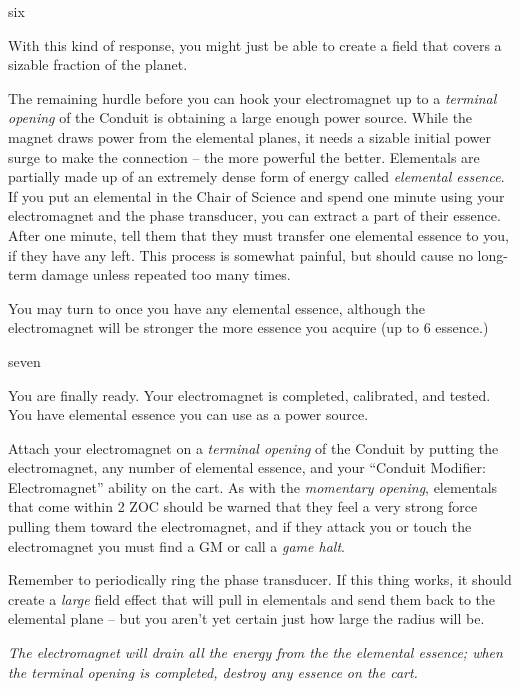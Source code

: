 \documentclass[notebook]{elementals}
\begin{document}
\begin{page}{six}

With this kind of response, you might just be able to create a field that covers a sizable fraction of the planet.

The remaining hurdle before you can hook your electromagnet up to a \emph{terminal opening} of the Conduit is obtaining a large enough power source. While the magnet draws power from the elemental planes, it needs a sizable initial power surge to make the connection -- the more powerful the better. Elementals are partially made up of an extremely dense form of energy called \emph{elemental essence}. If you put an elemental in the Chair of Science and spend one minute using your electromagnet and the phase transducer, you can extract a part of their essence. After one minute, tell them that they must transfer one elemental essence to you, if they have any left. This process is somewhat painful, but should cause no long-term damage unless repeated too many times.

You may turn to  once you have any elemental essence, although the electromagnet will be stronger the more essence you acquire (up to 6 essence.)

\end{page}

\begin{page}{seven}

You are finally ready. Your electromagnet is completed, calibrated, and tested. You have elemental essence you can use as a power source.

Attach your electromagnet on a \emph{terminal opening} of the Conduit by putting the electromagnet, any number of elemental essence, and your ``Conduit Modifier: Electromagnet'' ability on the cart. As with the \emph{momentary opening}, elementals that come within 2 ZOC should be warned that they feel a very strong force pulling them toward the electromagnet, and if they attack you or touch the electromagnet you must find a GM or call a \emph{game halt}.

Remember to periodically ring the phase transducer. If this thing works, it should create a \emph{large} field effect that will pull in elementals and send them back to the elemental plane -- but you aren't yet certain just how large the radius will be.

\emph{The electromagnet will drain all the energy from the the elemental essence; when the terminal opening is completed, destroy any essence on the cart.}

\end{page}

\endnotebook
\end{document}
